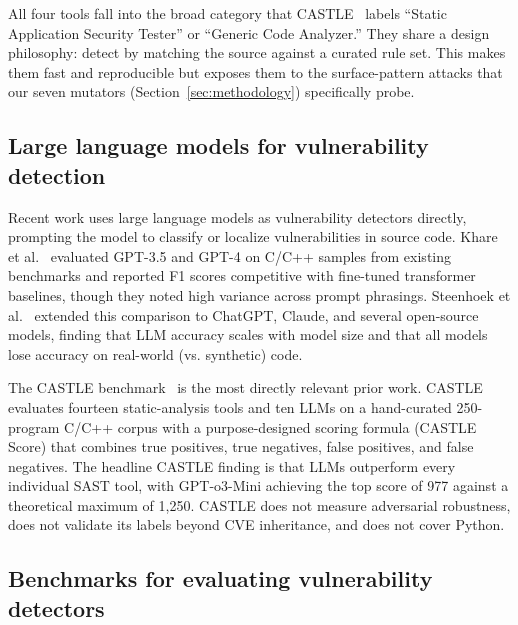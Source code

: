 All four tools fall into the broad category that
CASTLE~\cite{castle} labels ``Static Application Security
Tester'' or ``Generic Code Analyzer.'' They share a design philosophy:
detect by matching the source against a curated rule set. This makes
them fast and reproducible but exposes them to the surface-pattern
attacks that our seven mutators (Section~\ref{sec:methodology})
specifically probe.

\subsection{Large language models for vulnerability detection}
\label{sec:related:llm}

Recent work uses large language models as vulnerability detectors
directly, prompting the model to classify or localize vulnerabilities
in source code. Khare et al.~\cite{khare_llm} evaluated GPT-3.5
and GPT-4 on C/C++ samples from existing benchmarks and reported
F1 scores competitive with fine-tuned transformer baselines, though
they noted high variance across prompt phrasings. Steenhoek
et al.~\cite{steenhoek} extended this comparison to ChatGPT,
Claude, and several open-source models, finding that LLM accuracy
scales with model size and that all models lose accuracy on
real-world (vs. synthetic) code.

The CASTLE benchmark~\cite{castle} is the most directly
relevant prior work. CASTLE evaluates fourteen static-analysis tools
and ten LLMs on a hand-curated 250-program C/C++ corpus with a
purpose-designed scoring formula (CASTLE Score) that combines true
positives, true negatives, false positives, and false negatives.
The headline CASTLE finding is that LLMs outperform every individual
SAST tool, with GPT-o3-Mini achieving the top score of 977 against a
theoretical maximum of 1{,}250. CASTLE does not measure adversarial
robustness, does not validate its labels beyond CVE inheritance, and
does not cover Python.

\subsection{Benchmarks for evaluating vulnerability detectors}
\label{sec:related:benchmarks}

